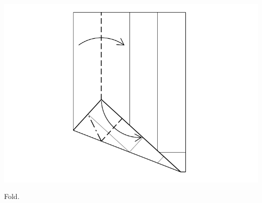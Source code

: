 \documentclass[11pt]{article}
\begin{document}
\begin{minipage}[t]{0.3\textwidth}
  \includegraphics[width=\textwidth]{../figs/fig08-06}
  \begin{itemize}{\item[6.] Fold.}\end{itemize}
\end{minipage}

\vspace*{0.5in}
\end{document}
